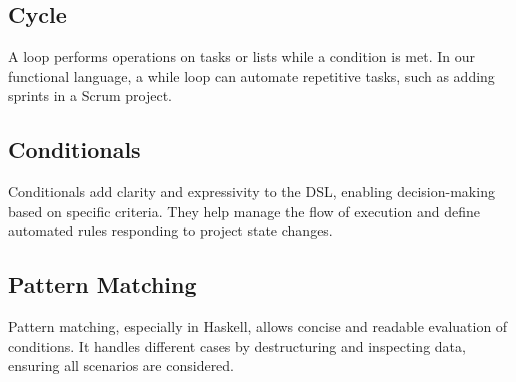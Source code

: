 \subsection{Cycle}
\label{sec:cycle}
A loop performs operations on tasks or lists while a condition is met. In our functional language, a while loop can automate repetitive tasks, such as adding sprints in a Scrum project.

\subsection{Conditionals}
\label{sec:conditionals}
Conditionals add clarity and expressivity to the DSL, enabling decision-making based on specific criteria. They help manage the flow of execution and define automated rules responding to project state changes.

\subsection{Pattern Matching}
\label{sec:pattern-matching}
Pattern matching, especially in Haskell, allows concise and readable evaluation of conditions. It handles different cases by destructuring and inspecting data, ensuring all scenarios are considered.

